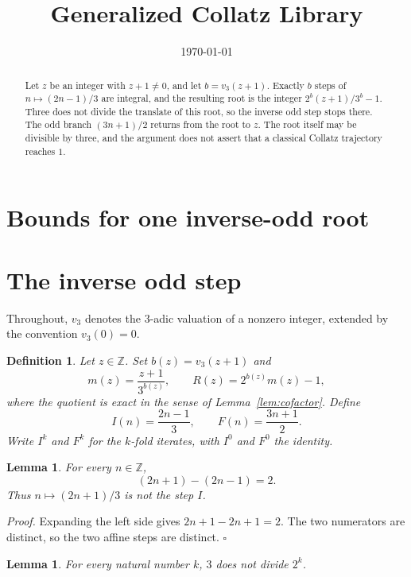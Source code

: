 \documentclass[11pt,letterpaper]{article}
\title{Generalized Collatz Library}
\author{}
\date{\today}
\newcommand{\Z}{\mathbb{Z}}
\newtheorem{lemma}[theorem]{Lemma}
\newtheorem{definition}[theorem]{Definition}
\newenvironment{proof}{\noindent\textit{Proof.}}{\hfill\(\square\)}
\begin{document}
\maketitle
\section*{Bounds for one inverse-odd root}

\begin{abstract}
Let \(z\) be an integer with \(z+1\neq 0\), and let \(b=v_3(z+1)\). Exactly \(b\) steps of \(n\mapsto(2n-1)/3\) are integral, and the resulting root is the integer \(2^b(z+1)/3^b-1\). Three does not divide the translate of this root, so the inverse odd step stops there. The odd branch \((3n+1)/2\) returns from the root to \(z\). The root itself may be divisible by three, and the argument does not assert that a classical Collatz trajectory reaches \(1\).
\end{abstract}

\section{The inverse odd step}

Throughout, \(v_3\) denotes the \(3\)-adic valuation of a nonzero integer, extended by the convention \(v_3(0)=0\).

\begin{definition}
\label{def:odd-root}
Let \(z\in\Z\). Set \(b(z)=v_3(z+1)\) and
\[
m(z)=\frac{z+1}{3^{b(z)}},
\qquad
R(z)=2^{b(z)}m(z)-1,
\]
where the quotient is exact in the sense of Lemma~\ref{lem:cofactor}. Define
\[
I(n)=\frac{2n-1}{3},
\qquad
F(n)=\frac{3n+1}{2}.
\]
Write \(I^k\) and \(F^k\) for the \(k\)-fold iterates, with \(I^0\) and \(F^0\) the identity.
\end{definition}

\begin{lemma}
\label{lem:distinct-numerators}
For every \(n\in\Z\),
\[
(2n+1)-(2n-1)=2.
\]
Thus \(n\mapsto(2n+1)/3\) is not the step \(I\).
\end{lemma}

\begin{proof}
Expanding the left side gives \(2n+1-2n+1=2\). The two numerators are distinct, so the two affine steps are distinct.
\end{proof}

\begin{lemma}
\label{lem:three-not-two}
For every natural number \(k\), \(3\) does not divide \(2^k\).
\end{lemma}
\end{document}
